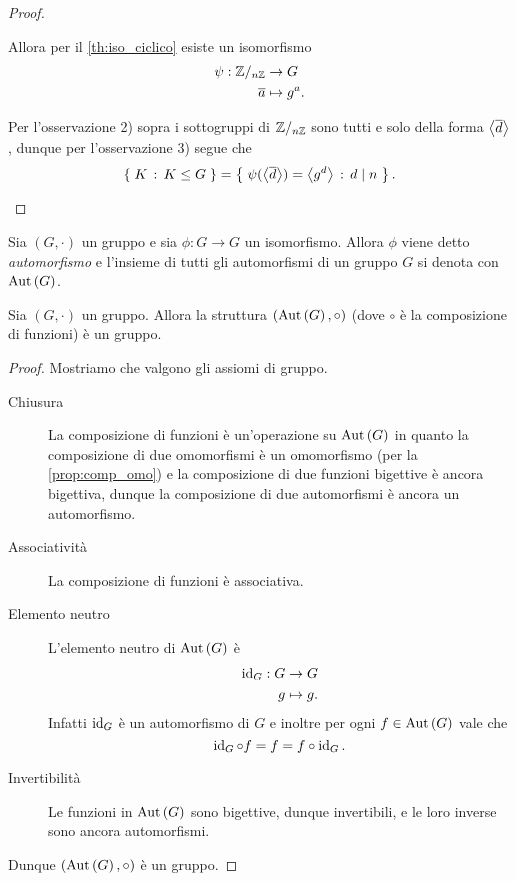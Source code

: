 \begin{proof}
\begin{enumerate}[label={(\roman*)}]
        Allora per il \autoref{th:iso_ciclico} esiste un isomorfismo \begin{align*}
            \psi : \Zmod n &\to G\\
            \eqcl a &\mapsto g^a.
        \end{align*}

        Per l'osservazione 2) sopra i sottogruppi di $\mathbb{Z}/_{n\mathbb{Z}}$ sono tutti e solo della forma $\displaystyle \gen*{\eqcl{d}}$, dunque per l'osservazione 3) segue che \[
            \set{K \suchthat K \sgr G} = \set{
                \psi(\gen*{\eqcl{d}}) 
            = \gen*{g^{d}} \suchthat d \divides n}. \qedhere   
        \] 
    \end{enumerate}
\end{proof}

\begin{definition}[Automorfismo]
    Sia $(G, \cdot)$ un gruppo e sia $\phi : G \to G$ un isomorfismo. Allora $\phi$ viene detto \emph{automorfismo} e l'insieme di tutti gli automorfismi di un gruppo $G$ si denota con $\operatorname{Aut}\left(G\right)$.
\end{definition}

\begin{proposition}
    Sia $(G, \cdot)$ un gruppo. Allora la struttura $(\operatorname{Aut}\left(G\right), \circ)$ (dove $\circ$ è la composizione di funzioni) è un gruppo.
\end{proposition}
\begin{proof}
    Mostriamo che valgono gli assiomi di gruppo.
    \begin{description}
        \item[Chiusura] La composizione di funzioni è un'operazione su $\operatorname{Aut}\left(G\right)$ in quanto la composizione di due omomorfismi è un omomorfismo (per la \autoref{prop:comp_omo}) e la composizione di due funzioni bigettive è ancora bigettiva, dunque la composizione di due automorfismi è ancora un automorfismo.
        \item[Associatività] La composizione di funzioni è associativa.
        \item[Elemento neutro] L'elemento neutro di $\operatorname{Aut}\left(G\right)$ è \begin{align*}
            \operatorname{id}_G : G &\to G \\
            g &\mapsto g.
        \end{align*}  Infatti $\operatorname{id}_G$ è un automorfismo di $G$ e inoltre per ogni $f \in \operatorname{Aut}\left(G\right)$ vale che\[
            \operatorname{id}_G \circ f = f = f \circ \operatorname{id}_G.
        \]
        \item[Invertibilità] Le funzioni in $\operatorname{Aut}\left(G\right)$ sono bigettive, dunque invertibili, e le loro inverse sono ancora automorfismi.
    \end{description}
    Dunque $(\operatorname{Aut}\left(G\right), \circ)$ è un gruppo.
\end{proof}

